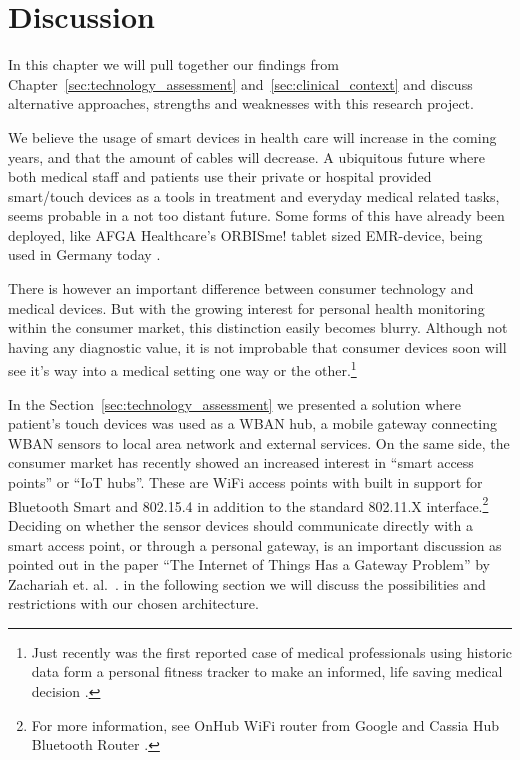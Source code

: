 \section{Discussion} %
\label{sec:discussion}

In this chapter we will pull together our findings from Chapter~\ref{sec:technology_assessment} and~\ref{sec:clinical_context} and discuss alternative approaches, strengths and weaknesses with this research project. 

We believe the usage of smart devices in health care will increase in the coming years, and that the amount of cables will decrease. A ubiquitous future where both medical staff and patients use their private or hospital provided smart/touch devices as a tools in treatment and everyday medical related tasks, seems probable in a not too distant future. Some forms of this have already been deployed, like AFGA Healthcare's ORBISme! tablet sized EMR-device, being used in Germany today \cite{newRef:271}. 

There is however an important difference between consumer technology and medical devices. But with the growing interest for personal health monitoring within the consumer market, this distinction easily becomes blurry. Although not having any diagnostic value, it is not improbable that consumer devices soon will see it's way into a medical setting one way or the other.\footnote{ Just recently was the first reported case of medical professionals using historic data form a personal fitness tracker to make an informed, life saving medical decision \cite{newRef:29}.}

In the Section~\ref{sec:technology_assessment} we presented a solution where patient's touch devices was used as a WBAN hub, a mobile gateway connecting WBAN sensors to local area network and external services. On the same side, the consumer market has recently showed an increased interest in ``smart access points'' or ``IoT hubs''. These are WiFi access points with built in support for Bluetooth Smart and 802.15.4 in addition to the standard 802.11.X interface.\footnote{ For more information, see OnHub WiFi router from Google \cite{newRef:60} and Cassia Hub Bluetooth Router \cite{newRef:61}.} Deciding on whether the sensor devices should communicate directly with a smart access point, or through a personal gateway, is an important discussion as pointed out in the paper ``The Internet of Things Has a Gateway Problem'' by Zachariah et. al.~\cite{Zachariah:2015cm}. in the following section we will discuss the possibilities and restrictions with our chosen architecture.

